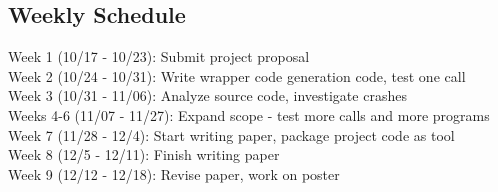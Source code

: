 \documentclass[10pt]{article}
\begin{document}
\subsection{Weekly Schedule}
\noindent Week 1 (10/17 - 10/23): Submit project proposal\\
Week 2 (10/24 - 10/31): Write wrapper code generation code, test one call\\
Week 3 (10/31 - 11/06): Analyze source code, investigate crashes\\
Weeks 4-6 (11/07 - 11/27): Expand scope - test more calls and more programs\\
Week 7 (11/28 - 12/4): Start writing paper, package project code as tool\\
Week 8 (12/5 - 12/11): Finish writing paper\\
Week 9 (12/12 - 12/18): Revise paper, work on poster\\
\end{document}
